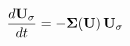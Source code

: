 \documentclass[preview]{standalone}
\begin{document}
\begin{align*}
\special{dvisvgm:raw <g id='unique000'>}\frac{d\mathbf{U}_\sigma}{dt} = -\mathbf{\Sigma}(\mathbf{U})\,\mathbf{U}_\sigma\special{dvisvgm:raw </g>}
\end{align*}
\end{document}
